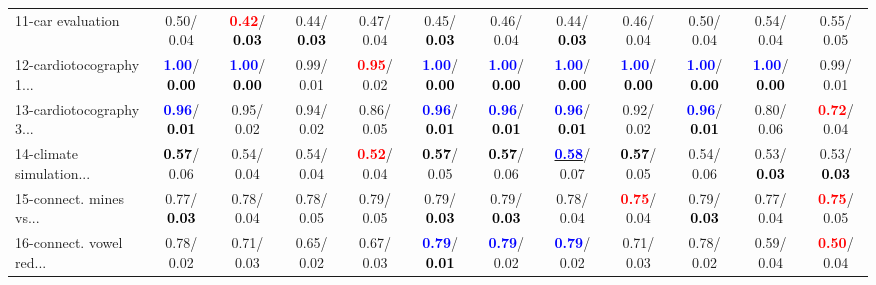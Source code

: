 \begin{table}[h]
\begin{center}
{\begin{tabular}{lc|c|c|c|c|c|c|c|c|c|c}
11-car evaluation &   0.50/  0.04 & \textcolor{red}{\textbf{  0.42}}/\textcolor{black}{\textbf{  0.03}} &   0.44/\textcolor{black}{\textbf{  0.03}} &   0.47/  0.04 &   0.45/\textcolor{black}{\textbf{  0.03}} &   0.46/  0.04 &   0.44/\textcolor{black}{\textbf{  0.03}} &   0.46/  0.04 &   0.50/  0.04 &   0.54/  0.04 &   0.55/  0.05 \\
12-cardiotocography 1... & \textcolor{blue}{\textbf{  1.00}}/\textcolor{black}{\textbf{  0.00}} & \textcolor{blue}{\textbf{  1.00}}/\textcolor{black}{\textbf{  0.00}} &   0.99/  0.01 & \textcolor{red}{\textbf{  0.95}}/  0.02 & \textcolor{blue}{\textbf{  1.00}}/\textcolor{black}{\textbf{  0.00}} & \textcolor{blue}{\textbf{  1.00}}/\textcolor{black}{\textbf{  0.00}} & \textcolor{blue}{\textbf{  1.00}}/\textcolor{black}{\textbf{  0.00}} & \textcolor{blue}{\textbf{  1.00}}/\textcolor{black}{\textbf{  0.00}} & \textcolor{blue}{\textbf{  1.00}}/\textcolor{black}{\textbf{  0.00}} & \textcolor{blue}{\textbf{  1.00}}/\textcolor{black}{\textbf{  0.00}} &   0.99/  0.01 \\
13-cardiotocography 3... & \textcolor{blue}{\textbf{  0.96}}/\textcolor{black}{\textbf{  0.01}} &   0.95/  0.02 &   0.94/  0.02 &   0.86/  0.05 & \textcolor{blue}{\textbf{  0.96}}/\textcolor{black}{\textbf{  0.01}} & \textcolor{blue}{\textbf{  0.96}}/\textcolor{black}{\textbf{  0.01}} & \textcolor{blue}{\textbf{  0.96}}/\textcolor{black}{\textbf{  0.01}} &   0.92/  0.02 & \textcolor{blue}{\textbf{  0.96}}/\textcolor{black}{\textbf{  0.01}} &   0.80/  0.06 & \textcolor{red}{\textbf{  0.72}}/  0.04 \\
14-climate simulation... & \textcolor{black}{\textbf{  0.57}}/  0.06 &   0.54/  0.04 &   0.54/  0.04 & \textcolor{red}{\textbf{  0.52}}/  0.04 & \textcolor{black}{\textbf{  0.57}}/  0.05 & \textcolor{black}{\textbf{  0.57}}/  0.06 & \underline{\textcolor{blue}{\textbf{  0.58}}}/  0.07 & \textcolor{black}{\textbf{  0.57}}/  0.05 &   0.54/  0.06 &   0.53/\textcolor{black}{\textbf{  0.03}} &   0.53/\textcolor{black}{\textbf{  0.03}} \\ \hline
15-connect. mines vs... &   0.77/\textcolor{black}{\textbf{  0.03}} &   0.78/  0.04 &   0.78/  0.05 &   0.79/  0.05 &   0.79/\textcolor{black}{\textbf{  0.03}} &   0.79/\textcolor{black}{\textbf{  0.03}} &   0.78/  0.04 & \textcolor{red}{\textbf{  0.75}}/  0.04 &   0.79/\textcolor{black}{\textbf{  0.03}} &   0.77/  0.04 & \textcolor{red}{\textbf{  0.75}}/  0.05 \\
16-connect. vowel red... &   0.78/  0.02 &   0.71/  0.03 &   0.65/  0.02 &   0.67/  0.03 & \textcolor{blue}{\textbf{  0.79}}/\textcolor{black}{\textbf{  0.01}} & \textcolor{blue}{\textbf{  0.79}}/  0.02 & \textcolor{blue}{\textbf{  0.79}}/  0.02 &   0.71/  0.03 &   0.78/  0.02 &   0.59/  0.04 & \textcolor{red}{\textbf{  0.50}}/  0.04 \\

\end{tabular}}
\end{center}
\end{table}
